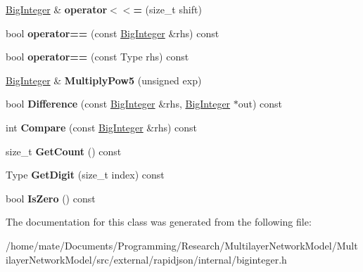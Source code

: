 \begin{DoxyCompactItemize}
\item 
\hyperlink{classinternal_1_1BigInteger}{Big\+Integer} \& {\bfseries operator$<$$<$=} (size\+\_\+t shift)\hypertarget{classinternal_1_1BigInteger_a48b12ef4676f19290dfd5816a4ef4a88}{}\label{classinternal_1_1BigInteger_a48b12ef4676f19290dfd5816a4ef4a88}

\item 
bool {\bfseries operator==} (const \hyperlink{classinternal_1_1BigInteger}{Big\+Integer} \&rhs) const \hypertarget{classinternal_1_1BigInteger_a567ecda3009de20400a2af649fb87e60}{}\label{classinternal_1_1BigInteger_a567ecda3009de20400a2af649fb87e60}

\item 
bool {\bfseries operator==} (const Type rhs) const \hypertarget{classinternal_1_1BigInteger_a329eddac1b724f82d56af2ee2c8abcc4}{}\label{classinternal_1_1BigInteger_a329eddac1b724f82d56af2ee2c8abcc4}

\item 
\hyperlink{classinternal_1_1BigInteger}{Big\+Integer} \& {\bfseries Multiply\+Pow5} (unsigned exp)\hypertarget{classinternal_1_1BigInteger_a98a13f169c27d1acfa57054f37c61763}{}\label{classinternal_1_1BigInteger_a98a13f169c27d1acfa57054f37c61763}

\item 
bool {\bfseries Difference} (const \hyperlink{classinternal_1_1BigInteger}{Big\+Integer} \&rhs, \hyperlink{classinternal_1_1BigInteger}{Big\+Integer} $\ast$out) const \hypertarget{classinternal_1_1BigInteger_a5741304ce36392adeef716e78b384b61}{}\label{classinternal_1_1BigInteger_a5741304ce36392adeef716e78b384b61}

\item 
int {\bfseries Compare} (const \hyperlink{classinternal_1_1BigInteger}{Big\+Integer} \&rhs) const \hypertarget{classinternal_1_1BigInteger_afd8b15480df5003ee6b6e1b8ecbf5f45}{}\label{classinternal_1_1BigInteger_afd8b15480df5003ee6b6e1b8ecbf5f45}

\item 
size\+\_\+t {\bfseries Get\+Count} () const \hypertarget{classinternal_1_1BigInteger_a720114cef0871c9f9c3c6a5f3a66e66a}{}\label{classinternal_1_1BigInteger_a720114cef0871c9f9c3c6a5f3a66e66a}

\item 
Type {\bfseries Get\+Digit} (size\+\_\+t index) const \hypertarget{classinternal_1_1BigInteger_a92c6854f2388875374cfb9801bea0cc8}{}\label{classinternal_1_1BigInteger_a92c6854f2388875374cfb9801bea0cc8}

\item 
bool {\bfseries Is\+Zero} () const \hypertarget{classinternal_1_1BigInteger_a99cf9cb87491a583c6b7614b0c8654fe}{}\label{classinternal_1_1BigInteger_a99cf9cb87491a583c6b7614b0c8654fe}

\end{DoxyCompactItemize}


The documentation for this class was generated from the following file\+:\begin{DoxyCompactItemize}
\item 
/home/mate/\+Documents/\+Programming/\+Research/\+Multilayer\+Network\+Model/\+Multilayer\+Network\+Model/src/external/rapidjson/internal/biginteger.\+h\end{DoxyCompactItemize}
